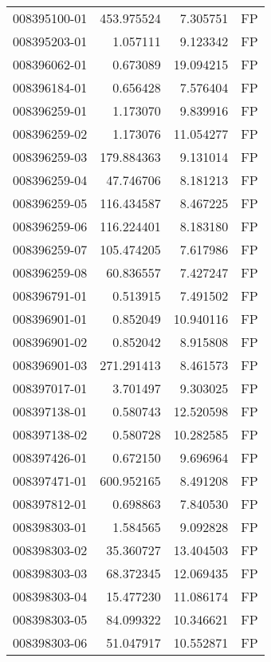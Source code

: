 \begin{tabular}{lrrl}
008395100-01 &  453.975524 &       7.305751 &   FP \\
008395203-01 &    1.057111 &       9.123342 &   FP \\
008396062-01 &    0.673089 &      19.094215 &   FP \\
008396184-01 &    0.656428 &       7.576404 &   FP \\
008396259-01 &    1.173070 &       9.839916 &   FP \\
008396259-02 &    1.173076 &      11.054277 &   FP \\
008396259-03 &  179.884363 &       9.131014 &   FP \\
008396259-04 &   47.746706 &       8.181213 &   FP \\
008396259-05 &  116.434587 &       8.467225 &   FP \\
008396259-06 &  116.224401 &       8.183180 &   FP \\
008396259-07 &  105.474205 &       7.617986 &   FP \\
008396259-08 &   60.836557 &       7.427247 &   FP \\
008396791-01 &    0.513915 &       7.491502 &   FP \\
008396901-01 &    0.852049 &      10.940116 &   FP \\
008396901-02 &    0.852042 &       8.915808 &   FP \\
008396901-03 &  271.291413 &       8.461573 &   FP \\
008397017-01 &    3.701497 &       9.303025 &   FP \\
008397138-01 &    0.580743 &      12.520598 &   FP \\
008397138-02 &    0.580728 &      10.282585 &   FP \\
008397426-01 &    0.672150 &       9.696964 &   FP \\
008397471-01 &  600.952165 &       8.491208 &   FP \\
008397812-01 &    0.698863 &       7.840530 &   FP \\
008398303-01 &    1.584565 &       9.092828 &   FP \\
008398303-02 &   35.360727 &      13.404503 &   FP \\
008398303-03 &   68.372345 &      12.069435 &   FP \\
008398303-04 &   15.477230 &      11.086174 &   FP \\
008398303-05 &   84.099322 &      10.346621 &   FP \\
008398303-06 &   51.047917 &      10.552871 &   FP \\

\end{tabular}
